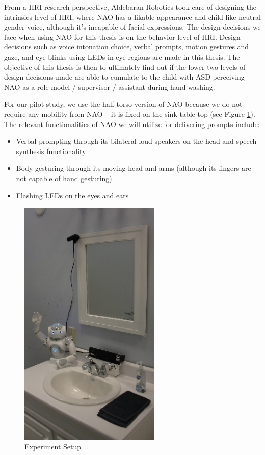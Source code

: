 From a HRI research perspective, Aldebaran Robotics took care of designing the intrinsics level of HRI, where NAO has a likable appearance and child like neutral gender voice, although it's incapable of facial expressions.  The design decisions we face when using NAO for this thesis is on the behavior level of HRI.  Design decisions such as voice intonation choice, verbal prompts, motion gestures and gaze, and eye blinks using LEDs in eye regions are made in this thesis.  The objective of this thesis is then to ultimately find out if the lower two levels of design decisions made are able to cumulate to the child with ASD perceiving NAO as a role model / supervisor / assistant during hand-washing.

For our pilot study, we use the half-torso version of NAO because we do not require any mobility from NAO -- it is fixed on the sink table top (see Figure \ref{fig:ExpSetup}).  The relevant functionalities of NAO we will utilize for delivering prompts include:
\begin{itemize}
	\item Verbal prompting through its bilateral loud speakers on the head and speech synthesis functionality
	\item Body gesturing through its moving head and arms (although its fingers are not capable of hand gesturing)
	\item Flashing LEDs on the eyes and ears
\end{itemize}
\begin{figure} [H]
	\centering
	\includegraphics[width=0.6\textwidth]{./img/exp_setup.jpg}
	\caption{Experiment Setup}
	\label{fig:ExpSetup}
\end{figure}


